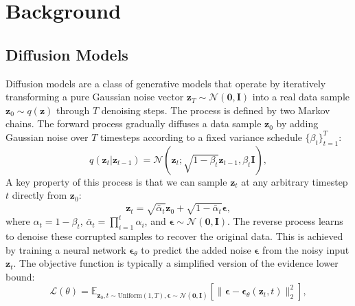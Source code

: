 \documentclass{article}
\begin{document}
\section{Background}
\label{sec:bg}

\subsection{Diffusion Models}
\label{sec:dm}

Diffusion models \citep{ddpm_2020, ddim_2021} are a class of generative models that operate by iteratively transforming a pure Gaussian noise vector $\boldsymbol{z}_T \sim \mathcal{N}(\boldsymbol{0}, \boldsymbol{I})$ into a real data sample $\boldsymbol{z}_0 \sim q(\boldsymbol{z})$ through $T$ denoising steps.
The process is defined by two Markov chains. The forward process gradually diffuses a data sample $\boldsymbol{z}_0$ by adding Gaussian noise over $T$ timesteps according to a fixed variance schedule $\{\beta_t\}_{t=1}^T$:
\begin{equation}
    q(\boldsymbol{z}_t|\boldsymbol{z}_{t-1}) = \mathcal{N}(\boldsymbol{z}_t; \sqrt{1 - \beta_t}\boldsymbol{z}_{t-1}, \beta_t\boldsymbol{I}),
\end{equation}
A key property of this process is that we can sample $\boldsymbol{z}_t$ at any arbitrary timestep $t$ directly from $\boldsymbol{z}_0$:
\begin{equation}
    \boldsymbol{z}_t = \sqrt{\bar{\alpha}_t}\boldsymbol{z}_0 + \sqrt{1 - \bar{\alpha}_t}\boldsymbol{\epsilon},
    \label{eq:diffusion}
\end{equation}
where $\alpha_t = 1 - \beta_t$, $\bar{\alpha}_t = \prod_{i=1}^{t}\alpha_i$, and $\boldsymbol{\epsilon} \sim \mathcal{N}(\boldsymbol{0}, \boldsymbol{I})$.
The reverse process learns to denoise these corrupted samples to recover the original data. This is achieved by training a neural network $\boldsymbol{\epsilon}_\theta$ to predict the added noise $\boldsymbol{\epsilon}$ from the noisy input $\boldsymbol{z}_t$. The objective function is typically a simplified version of the evidence lower bound:
\begin{equation}
    \mathcal{L}(\theta) = \mathbb{E}_{\boldsymbol{z}_0, t\sim\text{Uniform}(1,T), \boldsymbol{\epsilon}\sim\mathcal{N}(\boldsymbol{0},\boldsymbol{I})} \left[ \|\boldsymbol{\epsilon} - \boldsymbol{\epsilon}_\theta(\boldsymbol{z}_t, t)\|_2^2 \right],
\end{equation}
\end{document}

